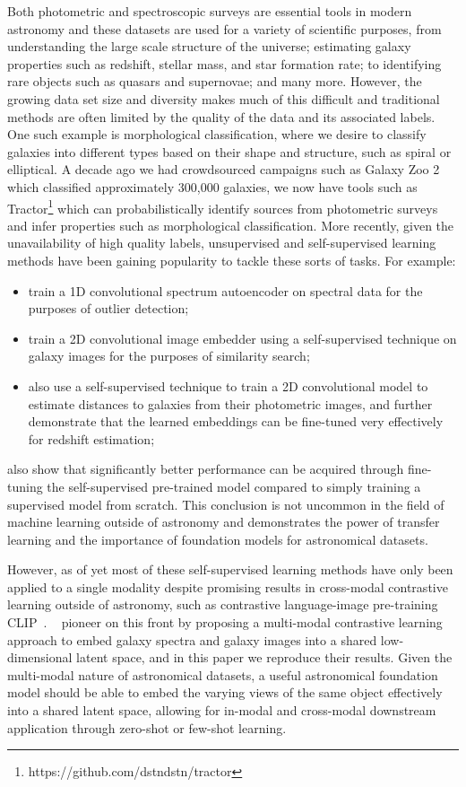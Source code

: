 \documentclass[a4paper,11pt]{article}
\begin{document}
Both photometric and spectroscopic surveys are essential tools in modern astronomy and these datasets are used for
a variety of scientific purposes, from understanding the large scale structure of the universe;
estimating galaxy properties such as redshift, stellar mass, and star formation rate; to identifying rare objects such as
quasars and supernovae; and many more.
However, the growing data set size and diversity makes much of this difficult and traditional methods are often
limited by the quality of the data and its associated labels.
One such example is morphological classification, where we desire to classify galaxies into different types based on their
shape and structure, such as spiral or elliptical.
A decade ago we had crowdsourced campaigns such as Galaxy Zoo 2~\citep{willet2013} which classified approximately
300,000 galaxies, we now have tools such as Tractor\footnote{https://github.com/dstndstn/tractor}
which can probabilistically identify sources from photometric surveys and infer properties such as morphological classification.
More recently, given the unavailability of high quality labels, unsupervised and self-supervised learning methods have been
gaining popularity to tackle these sorts of tasks.
For example:
\begin{itemize}
    \item \cite{liang2023} train a 1D convolutional spectrum autoencoder on spectral data for the purposes of outlier
    detection;
    \item \cite{stein2021} train a 2D convolutional image embedder using a self-supervised technique on galaxy images
    for the purposes of similarity search;
    \item \cite{hayat2021} also use a self-supervised technique to train a 2D convolutional model to estimate distances to galaxies from their
    photometric images, and further demonstrate that the learned embeddings can be fine-tuned very effectively for redshift estimation;
\end{itemize}
\cite{hayat2021} also show that significantly better performance can be acquired through fine-tuning the self-supervised
pre-trained model compared to simply training a supervised model from scratch.
This conclusion is not uncommon in the field of machine learning outside of astronomy and demonstrates the power
of transfer learning and the importance of foundation models for astronomical datasets.

However, as of yet most of these self-supervised learning methods have only been applied to a single modality despite
promising results in cross-modal contrastive learning outside of astronomy, such as contrastive language-image pre-training CLIP~\citep{radford2021}.
~\cite{astroclip} pioneer on this front by proposing a multi-modal contrastive learning approach to embed galaxy spectra
and galaxy images into a shared low-dimensional latent space, and in this paper we reproduce their results.
Given the multi-modal nature of astronomical datasets, a useful astronomical foundation model should be able to embed
the varying views of the same object effectively into a shared latent space, allowing for in-modal and cross-modal downstream
application through zero-shot or few-shot learning.
\end{document}

